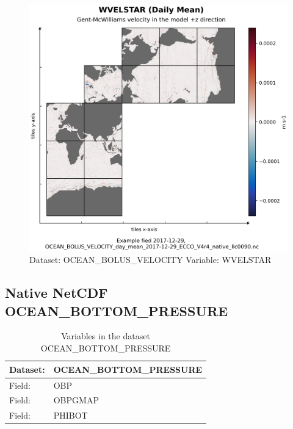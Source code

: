 \begin{figure}[H]
\centering
\includegraphics[scale=0.55]{../images/plots/native_plots/Gent-McWilliams_Ocean_Bolus_Velocity/WVELSTAR.png}
\caption{Dataset: OCEAN\_BOLUS\_VELOCITY Variable: WVELSTAR}
\label{tab:table-OCEAN_BOLUS_VELOCITY_WVELSTAR-Plot}
\end{figure}
\pagebreak
\subsection{Native NetCDF OCEAN\_BOTTOM\_PRESSURE}
\newp
\begin{longtable}{|p{}|p{}|}
\caption{Variables in the dataset OCEAN\_BOTTOM\_PRESSURE}
\label{tab:table-OCEAN_BOTTOM_PRESSURE-fields} \\ 
\hline \endhead \hline \endfoot
\rowcolor{lightgray} \textbf{Dataset:} & \textbf{OCEAN\_BOTTOM\_PRESSURE} \\ \hline
Field: &OBP \\ \hline
Field: &OBPGMAP \\ \hline
Field: &PHIBOT \\ \hline
\end{longtable}

\pagebreak
